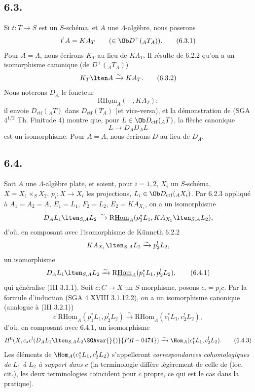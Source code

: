 \subsection*{6.3.}
Si $t:T\to S$ est un $S$-schéma, et $A$ une $\Lambda$-algèbre, nous poserons
\begin{equation}
t^!A = KA_T \qquad(\in\Ob D^+({}_AT_A)).
\tag{6.3.1}
\end{equation}
Pour $A=\Lambda$, nous écrirons $K_T$ au lieu de $K\Lambda_T$. Il résulte de 6.2.2 qu'on a un isomorphisme canonique (de $D^+({}_AT_A)$)
\begin{equation}
K_T\lten A\xrightarrow{\sim}KA_T.
\tag{6.3.2}
\end{equation}
Nous noterons $D_A$ le foncteur
\[
\mathrm{R}\underline{\mathrm{Hom}}_A(-,KA_T) :
\]
il envoie $D_{\mathrm{ctf}}({}_AT)$ dans $D_{\mathrm{ctf}}(T_A)$ (et vice-versa), et la démonstration de (SGA $4^{1/2}$ Th. Finitude 4) montre que, pour $L\in\Ob D_{\mathrm{ctf}}({}_AT)$, la flèche canonique
\[
L\longrightarrow D_AD_AL
\]
est un isomorphisme. Pour $A=\Lambda$, nous écrirons $D$ au lieu de $D_A$.

\subsection*{6.4.}
Soit $A$ une $\Lambda$-algèbre plate, et soient, pour $i=1,2$, $X_i$ un $S$-schéma, $X=X_1\times_SX_2$, $p_i:X\to X_i$ les projections, $L_i\in\Ob D_{\mathrm{ctf}}({}_AX_i)$. Par 6.2.3 appliqué à $A_1=A_2=A$, $E_1=L_1$, $F_2=L_2$, $E_2=KA_{X_1}$, on a un isomorphisme
\[
D_A L_1\lten_{S,A}L_2
\xrightarrow{\sim}
\mathrm{R}\underline{\mathrm{Hom}}_A(p_1^*L_1,KA_{X_1}\lten_{S,A}L_2),
\]
d'où, en composant avec l'isomorphisme de Künneth 6.2.2
\[
KA_{X_1}\lten_{S,A}L_2\xrightarrow{\sim}p_2^!L_2,
\]
un isomorphisme
\begin{equation}
D_AL_1\lten_{S,A}L_2
\xrightarrow{\sim}
\mathrm{R}\underline{\mathrm{Hom}}_A(p_1^*L_1,p_2^!L_2),
\tag{6.4.1}
\end{equation}
qui généralise (III 3.1.1). Soit $c:C\to X$ un $S$-morphisme, posons $c_i=p_ic$. Par la formule d'induction (SGA 4 XVIII 3.1.12.2), on a un isomorphisme canonique (analogue à (III 3.2.1))
\begin{equation}
c^!\mathrm{R}\underline{\mathrm{Hom}}_A(p_1^*L_1,p_2^!L_2)
\xrightarrow{\sim}
\mathrm{R}\underline{\mathrm{Hom}}_A(c_1^*L_1,c_2^!L_2),
\tag{6.4.2}
\end{equation}
d'où, en composant avec 6.4.1, un isomorphisme
\begin{equation}
H^0(X,c_*c^!(D_AL_1\lten_{S,A}L_2\SGAvar{}{)}{FR-0474})
\xrightarrow{\sim}
\Hom_A(c_1^*L_1,c_2^!L_2).
\tag{6.4.3}
\end{equation}
Les éléments de $\Hom_A(c_1^*L_1,c_2^!L_2)$ s'appelleront \emph{correspondances cohomologiques de} $L_1$ \emph{à} $L_2$ \emph{à support dans} $c$ (la terminologie diffère légèrement de celle de (loc. cit.), les deux terminologies coïncident pour $c$ propre, ce qui est le cas dans la pratique).


